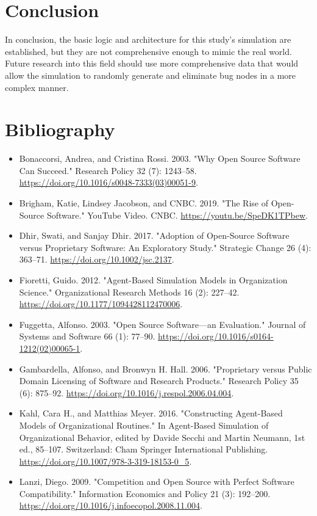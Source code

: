 \documentclass[10pt, a4paper, fleqn]{article}
\begin{document}
\section{Conclusion}
In conclusion, the basic logic and architecture for this study's simulation are established, but they are not comprehensive enough to mimic the real world. Future research into this field should use more comprehensive data that would allow the simulation to randomly generate and eliminate bug nodes in a more complex manner.
\newpage\section{Bibliography}
\begin{itemize}
	\item Bonaccorsi, Andrea, and Cristina Rossi. 2003. "Why Open Source Software Can Succeed." Research Policy 32 (7): 1243–58. \url{https://doi.org/10.1016/s0048-7333(03)00051-9}.
	\item Brigham, Katie, Lindsey Jacobson, and CNBC. 2019. "The Rise of Open-Source Software." YouTube Video. CNBC. \url{https://youtu.be/SpeDK1TPbew}.
	\item Dhir, Swati, and Sanjay Dhir. 2017. "Adoption of Open-Source Software versus Proprietary Software: An Exploratory Study." Strategic Change 26 (4): 363–71. \url{https://doi.org/10.1002/jsc.2137}.
	\item Fioretti, Guido. 2012. "Agent-Based Simulation Models in Organization Science." Organizational Research Methods 16 (2): 227–42. \url{https://doi.org/10.1177/1094428112470006}.
	\item Fuggetta, Alfonso. 2003. "Open Source Software––an Evaluation." Journal of Systems and Software 66 (1): 77–90. \url{https://doi.org/10.1016/s0164-1212(02)00065-1}.
	\item Gambardella, Alfonso, and Bronwyn H. Hall. 2006. "Proprietary versus Public Domain Licensing of Software and Research Products." Research Policy 35 (6): 875–92. \url{https://doi.org/10.1016/j.respol.2006.04.004}.
	\item Kahl, Cara H., and Matthias Meyer. 2016. "Constructing Agent-Based Models of Organizational Routines." In Agent-Based Simulation of Organizational Behavior, edited by Davide Secchi and Martin Neumann, 1st ed., 85–107. Switzerland: Cham Springer International Publishing. \url{https://doi.org/10.1007/978-3-319-18153-0\_5}.
	\item Lanzi, Diego. 2009. "Competition and Open Source with Perfect Software Compatibility." Information Economics and Policy 21 (3): 192–200. \url{https://doi.org/10.1016/j.infoecopol.2008.11.004}.

\end{itemize}
\end{document}
